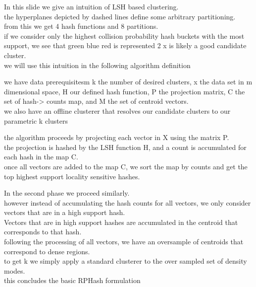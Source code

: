 \documentclass{beamer}
\begin{document}
\begin{frame}[plain]
In this slide we give an intuition of LSH based clustering. \\

the hyperplanes depicted
by dashed lines define some arbitrary partitioning.\\ 

from this we get 4 hash functions
and 8 partitions. \\

if we consider only the highest collision probability hash buckets
with the most support, we see that green blue red is represented 2 x is likely a good
candidate cluster. \\

we will use this intuition in the following algorithm definition
\end{frame}

\begin{frame}[plain]
we have data prerequisitesm k the number of desired clusters, x the data set in m
dimensional space, H our defined hash function, P the projection matrix, C the
set of hash-> counts map, and M the set of centroid vectors. \\

we also have an offline
clusterer that resolves our candidate clusters to our parametric k clusters
\end{frame}

\begin{frame}[plain]
the algorithm proceeds by projecting each vector in X using the matrix P.\\

the projection is hashed by the LSH function H, and a count is accumulated for each
hash in the map C. \\

once all vectors are added to the map C, we sort the map by counts
and get the top highest support locality sensitive hashes.
\end{frame}

\begin{frame}[plain]
In the second phase we proceed similarly. \\

however instead of accumulating the hash
counts for all vectors, we only consider vectors that are in a high support hash.\\

Vectors that are in high support hashes are accumulated in the centroid that
corresponds to that hash.\\

following the processing of all vectors, we have an oversample of centroids that
correspond to dense regions. \\

to get k we simply apply a standard clusterer to
the over sampled set of density modes.\\

this concludes the basic RPHash formulation
\end{frame}
\end{document}
